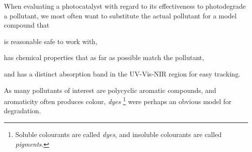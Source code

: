 \documentclass[draft,webedition,openright,titles,swedish,english]{LuaUUThesis}\usepackage[]{graphicx}\usepackage[]{xcolor}
\begin{document}
When evaluating a photocatalyst with regard to its effectiveness to photodegrade
a pollutant, we most often want to substitute the actual pollutant for a model
compound that
\begin{enumerate*}[label=(\alph*)]
\item is reasonable safe to work with,
\item has chemical properties that as far as possible match the pollutant,
\item and has a distinct absorption band in the \gls{UV-Vis-NIR} region for easy tracking.
\end{enumerate*}
As many pollutants of interest are polycyclic aromatic compounds,
and aromaticity often produces colour, \emph{dyes}%
\footnote{%
   Soluble colourants are called \emph{dyes},
   and insoluble colourants are called \emph{pigments}.
}
were perhaps an obvious model for  degradation.

%
\end{document}
